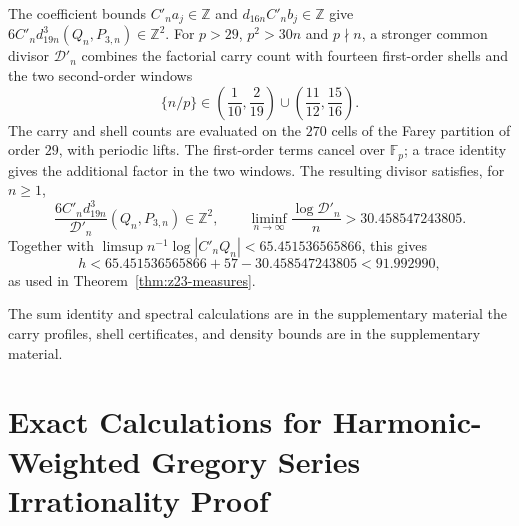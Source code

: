 \documentclass[oneside,english,11pt]{amsart}
\begin{document}
The coefficient bounds $C'_na_j\in\mathbb Z$ and
$d_{16n}C'_nb_j\in\mathbb Z$ give
$6C'_nd_{19n}^3(Q_n,P_{3,n})\in\mathbb Z^2$.
For $p>29$, $p^2>30n$ and $p\nmid n$, a stronger common divisor
$\mathcal D'_n$ combines the factorial carry count with fourteen
first-order shells and the two second-order windows
\[
 \{n/p\}\in
 \left(\frac1{10},\frac2{19}\right)
 \cup\left(\frac{11}{12},\frac{15}{16}\right).
\]
The carry and shell counts are evaluated on the $270$ cells of the
Farey partition of order $29$, with periodic lifts.
The first-order terms cancel over $\mathbb F_p$; a trace identity
gives the additional factor in the two windows.
The resulting divisor satisfies, for $n\ge1$,
\[
 \frac{6C'_nd_{19n}^3}{\mathcal D'_n}(Q_n,P_{3,n})\in\mathbb Z^2,
 \qquad
 \liminf_{n\to\infty}\frac{\log\mathcal D'_n}{n}
 >30.458547243805.
\]
Together with
$\limsup n^{-1}\log|C'_nQ_n|<65.451536565866$, this gives
\[
 h<65.451536565866+57-30.458547243805<91.992990,
\]
as used in Theorem~\ref{thm:z23-measures}.

The sum identity and spectral calculations are in
the supplementary material the carry profiles, shell certificates, and density bounds are in
the supplementary material.

\section{Exact Calculations for Harmonic-Weighted Gregory Series Irrationality Proof}
\label{app:gregory-series}
\end{document}
